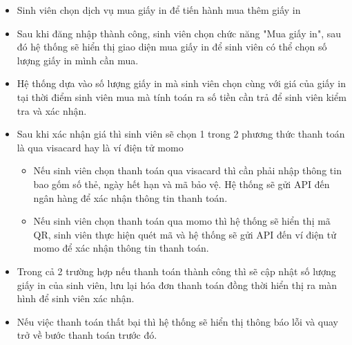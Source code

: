 \begin{itemize}
        \item Sinh viên chọn dịch vụ mua giấy in để tiến hành mua thêm giấy in
        \item Sau khi đăng nhập thành công, sinh viên chọn chức năng "Mua giấy in", sau đó hệ thống sẽ hiển thị giao diện mua giấy in để sinh viên có thể chọn số lượng giấy in mình cần mua.
        \item Hệ thống dựa vào số lượng giấy in mà sinh viên chọn cùng với giá của giấy in tại thời điểm sinh viên mua mà tính toán ra số tiền cần trả để sinh viên kiểm tra và xác nhận.
        \item Sau khi xác nhận giá thì sinh viên sẽ chọn 1 trong 2 phương thức thanh toán là qua visacard hay là ví điện tử momo
        \begin{itemize}
            \item Nếu sinh viên chọn thanh toán qua visacard thì cần phải nhập thông tin bao gốm số thẻ, ngày hết hạn và mã bảo vệ. Hệ thống sẽ gửi API đến ngân hàng để xác nhận thông tin thanh toán.
            \item Nếu sinh viên chọn thanh toán qua momo thì hệ thống sẽ hiển thị mã QR, sinh viên thực hiện quét mã và hệ thống sẽ gửi API đến ví điện tử momo để xác nhận thông tin thanh toán.
        \end{itemize}
        \item Trong cả 2 trường hợp nếu thanh toán thành công thì sẽ cập nhật số lượng giấy in của sinh viên, lưu lại hóa đơn thanh toán đồng thời hiển thị ra màn hình để sinh viên xác nhận.
        \item Nếu việc thanh toán thất bại thì hệ thống sẽ hiển thị thông báo lỗi và quay trở về bước thanh toán trước đó.
    \end{itemize}


    \newpage
